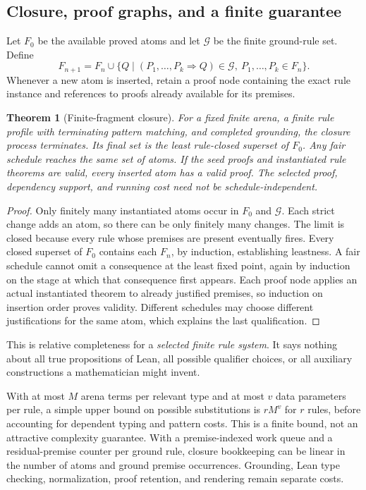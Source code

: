 \documentclass[11pt,a4paper]{article}
\newtheorem{theorem}{Theorem}[section]
\theoremstyle{definition}
\theoremstyle{remark}
\begin{document}
\subsection{Closure, proof graphs, and a finite guarantee}

Let $F_0$ be the available proved atoms and let $\mathcal G$ be the finite
ground-rule set. Define
\[
 F_{n+1}=F_n\cup
 \{Q\mid (P_1,\ldots,P_k\Rightarrow Q)\in\mathcal G,
                    \ P_1,\ldots,P_k\in F_n\}.
\]
Whenever a new atom is inserted, retain a proof node containing the exact rule
instance and references to proofs already available for its premises.

\begin{theorem}[Finite-fragment closure]\label{thm:closure}
For a fixed finite arena, a finite rule profile with terminating pattern
matching, and completed grounding, the closure process terminates. Its final
set is the least rule-closed superset of $F_0$. Any fair schedule reaches the
same set of atoms. If the seed proofs and instantiated rule theorems are valid,
every inserted atom has a valid proof. The selected proof, dependency support,
and running cost need not be schedule-independent.
\end{theorem}

\begin{proof}
Only finitely many instantiated atoms occur in $F_0$ and $\mathcal G$. Each
strict change adds an atom, so there can be only finitely many changes. The
limit is closed because every rule whose premises are present eventually fires.
Every closed superset of $F_0$ contains each $F_n$, by induction, establishing
leastness. A fair schedule cannot omit a consequence at the least fixed point,
again by induction on the stage at which that consequence first appears.
Each proof node applies an actual instantiated theorem to already justified
premises, so induction on insertion order proves validity. Different schedules
may choose different justifications for the same atom, which explains the last
qualification.
\end{proof}

This is relative completeness for a \emph{selected finite rule system}. It says
nothing about all true propositions of Lean, all possible qualifier choices,
or all auxiliary constructions a mathematician might invent.

With at most $M$ arena terms per relevant type and at most $v$ data parameters
per rule, a simple upper bound on possible substitutions is $rM^v$ for $r$
rules, before accounting for dependent typing and pattern costs. This is a
finite bound, not an attractive complexity guarantee. With a premise-indexed
work queue and a residual-premise counter per ground rule, closure bookkeeping
can be linear in the number of atoms and ground premise occurrences. Grounding,
Lean type checking, normalization, proof retention, and rendering remain
separate costs.
\end{document}
